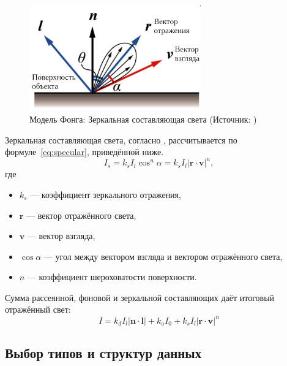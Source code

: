 \begin{figure}[H]
	\centering
	\includegraphics[width=0.66\textwidth]{img/specular_ru}
    \caption{Модель Фонга: Зеркальная составляющая света (Источник: \cite{phong})}
	\label{fig:specular}
\end{figure}

Зеркальная составляющая света, согласно \cite{phong}, рассчитывается по формуле~\ref{eq:specular}, приведённой ниже.
\begin{equation}
    I_s = k_s I_l \cos^n \alpha = k_s I_l \left| \boldsymbol{r} \cdot \boldsymbol{v} \right|^n,
    \label{eq:specular}
\end{equation}
где
\begin{itemize}
    \item $k_s$ --- коэффициент зеркального отражения,
    \item $\boldsymbol{r}$ --- вектор отражённого света,
    \item $\boldsymbol{v}$ --- вектор взгляда,
    \item $\cos \alpha$ --- угол между вектором взгляда и вектором отражённого света,
    \item $n$ --- коэффициент шероховатости поверхности.
\end{itemize}

Сумма рассеянной, фоновой и зеркальной составляющих даёт итоговый отражённый свет:
\begin{equation}
    I = k_d I_l \left| \boldsymbol{n} \cdot \boldsymbol{l} \right| + k_a I_0 + k_s I_l \left| \boldsymbol{r} \cdot \boldsymbol{v} \right|^n
    \label{eq:phong}
\end{equation}


\subsection{Выбор типов и структур данных}

